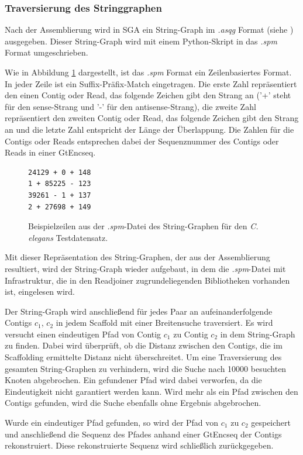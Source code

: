 \documentclass[a4paper,10pt,parskip]{scrartcl}
\begin{document}
\subsubsection{Traversierung des Stringgraphen}
Nach der Assemblierung wird in SGA ein String-Graph im \textit{.asqg}
Format (siehe \cite{asqg}) ausgegeben. Dieser String-Graph wird mit
einem Python-Skript in das \textit{.spm} Format umgeschrieben.

Wie in Abbildung \ref{abb: spm} dargestellt, ist das \textit{.spm}
Format ein Zeilenbasiertes Format. In jeder Zeile ist ein
Suffix-Präfix-Match eingetragen. Die erste Zahl repräsentiert den
einen Contig oder Read, das folgende Zeichen gibt den Strang an ('+'
steht für den sense-Strang und '-' für den antisense-Strang), die
zweite Zahl repräsentiert den zweiten Contig oder Read, das folgende
Zeichen gibt den Strang an und die letzte Zahl entspricht der Länge
der Überlappung. Die Zahlen für die Contigs oder Reads entsprechen
dabei der Sequenznummer des Contigs oder Reads in einer GtEncseq.

\begin{figure}
  \centering
\begin{verbatim}
24129 + 0 + 148
1 + 85225 - 123
39261 - 1 + 137
2 + 27698 + 149
\end{verbatim}
\caption{\label{abb: spm}Beispielzeilen aus der \textit{.spm}-Datei des
  String-Graphen für den \textit{C. elegans} Testdatensatz.}
\end{figure}

Mit dieser Repräsentation des String-Graphen, der aus der
Assemblierung resultiert, wird der String-Graph wieder aufgebaut, in
dem die \textit{.spm}-Datei mit Infrastruktur, die in den Readjoiner
zugrundeliegenden Bibliotheken vorhanden ist, eingelesen wird.

Der String-Graph wird anschließend für jedes Paar an
aufeinanderfolgende Contigs $c_1$, $c_2$ in jedem Scaffold mit einer
Breitensuche traversiert. Es wird versucht einen eindeutigen Pfad von
Contig $c_1$ zu Contig $c_2$ in dem String-Graph zu finden. Dabei wird
überprüft, ob die Distanz zwischen den Contigs, die im Scaffolding
ermittelte Distanz nicht überschreitet. Um eine Traversierung des
gesamten String-Graphen zu verhindern, wird die Suche nach \num{10000}
besuchten Knoten abgebrochen. Ein gefundener Pfad wird dabei
verworfen, da die Eindeutigkeit nicht garantiert werden kann. Wird
mehr als ein Pfad zwischen den Contigs gefunden, wird die Suche
ebenfalls ohne Ergebnis abgebrochen.

Wurde ein eindeutiger Pfad gefunden, so wird der Pfad von $c_1$ zu
$c_2$ gespeichert und anschließend die Sequenz des Pfades anhand einer
GtEncseq der Contigs rekonstruiert. Diese rekonstruierte Sequenz wird
schließlich zurückgegeben.
\end{document}
